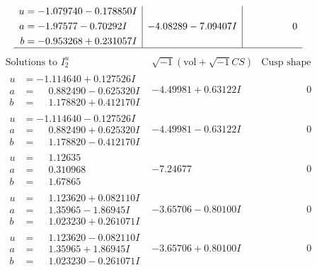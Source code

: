 \documentclass[1p]{elsarticle_modified}
\theoremstyle{definition}
\newcommand{\I}{\sqrt{-1}}
\begin{document}
$$\begin{array}{c|c|c}
\begin{aligned}
u &= -1.079740 - 0.178850 I \\
a &= -1.97577 - 0.70292 I \\
b &= -0.953268 + 0.231057 I\end{aligned}
 & -4.08289 - 7.09407 I & \phantom{-0.000000 } 0\\
 \hline 
 \end{array}$$\newpage$$\begin{array}{c|c|c}  
\text{Solutions to }I^u_{2}& \I (\text{vol} + \sqrt{-1}CS) & \text{Cusp shape}\\
 \hline 
\begin{aligned}
u &= -1.114640 + 0.127526 I \\
a &= \phantom{-}0.882490 - 0.625320 I \\
b &= \phantom{-}1.178820 + 0.412170 I\end{aligned}
 & -4.49981 + 0.63122 I & \phantom{-0.000000 } 0 \\ \hline\begin{aligned}
u &= -1.114640 - 0.127526 I \\
a &= \phantom{-}0.882490 + 0.625320 I \\
b &= \phantom{-}1.178820 - 0.412170 I\end{aligned}
 & -4.49981 - 0.63122 I & \phantom{-0.000000 } 0 \\ \hline\begin{aligned}
u &= \phantom{-}1.12635\phantom{ +0.000000I} \\
a &= \phantom{-}0.310968\phantom{ +0.000000I} \\
b &= \phantom{-}1.67865\phantom{ +0.000000I}\end{aligned}
 & -7.24677\phantom{ +0.000000I} & \phantom{-0.000000 } 0 \\ \hline\begin{aligned}
u &= \phantom{-}1.123620 + 0.082110 I \\
a &= \phantom{-}1.35965 - 1.86945 I \\
b &= \phantom{-}1.023230 + 0.261071 I\end{aligned}
 & -3.65706 - 0.80100 I & \phantom{-0.000000 } 0 \\ \hline\begin{aligned}
u &= \phantom{-}1.123620 - 0.082110 I \\
a &= \phantom{-}1.35965 + 1.86945 I \\
b &= \phantom{-}1.023230 - 0.261071 I\end{aligned}
 & -3.65706 + 0.80100 I & \phantom{-0.000000 } 0 \\ \hline\begin{aligned}

\end{aligned}
\end{array}$$
\end{document}

